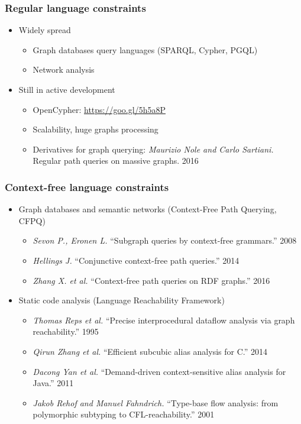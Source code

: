 \documentclass[xcolor=table,aspectratio=169]{beamer}
\begin{document}
\begin{frame}[fragile]
  \transwipe[direction=90]
  \frametitle{Regular language constraints}
  \begin{itemize}
   \item Widely spread
    \begin{itemize}
      \item Graph databases query languages (SPARQL, Cypher, PGQL)
      \item Network analysis
    \end{itemize}  
    \item Still in active development
    \begin{itemize}
      \item OpenCypher: \url{https://goo.gl/5h5a8P}
      \item Scalability, huge graphs processing
      \item Derivatives for graph querying: \emph{Maurizio Nole and Carlo Sartiani.} Regular path queries on massive graphs. 2016
    \end{itemize}   
  \end{itemize}
\end{frame}


\begin{frame}[fragile]
  \transwipe[direction=90]
  \frametitle{Context-free language constraints}
  \begin{itemize}
  \item Graph databases and semantic networks (Context-Free Path Querying, CFPQ)
    \begin{itemize}
        \item \emph{Sevon P., Eronen L.} ``Subgraph queries by context-free grammars.'' 2008
        \item \emph{Hellings J.} ``Conjunctive context-free path queries.'' 2014
        \item \emph{Zhang X. et al.} ``Context-free path queries on RDF graphs.'' 2016
    \end{itemize}
    \item Static code analysis (Language Reachability Framework)
    \begin{itemize}
        \item \emph{Thomas Reps et al.} ``Precise interprocedural dataflow analysis via graph reachability.'' 1995 
        \item \emph{Qirun Zhang et al.}  ``Efficient subcubic alias analysis for C.'' 2014
        \item \emph{Dacong Yan et al.} ``Demand-driven context-sensitive alias analysis for Java.'' 2011
        \item \emph{Jakob Rehof and Manuel Fahndrich.} ``Type-base flow analysis: from polymorphic subtyping to CFL-reachability.'' 2001
    \end{itemize}
  \end{itemize}
\end{frame}
\end{document}
